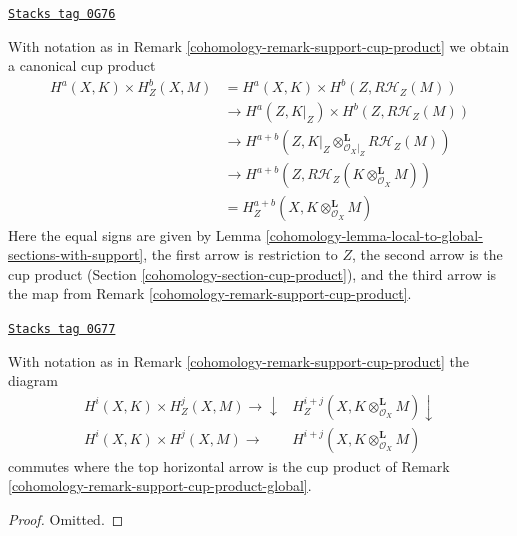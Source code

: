 \begin{remark}
\label{cohomology-remark-support-cup-product-global}
\href{https://stacks.math.columbia.edu/tag/0G76}{\texttt{Stacks tag 0G76}}

With notation as in Remark \ref{cohomology-remark-support-cup-product}
we obtain a canonical cup product
\begin{align*}
H^a(X, K) \times H^b_Z(X, M)
& =
H^a(X, K) \times H^b(Z, R\mathcal{H}_Z(M)) \\
& \to
H^a(Z, K|_Z) \times H^b(Z, R\mathcal{H}_Z(M)) \\
& \to
H^{a + b}(Z, K|_Z \otimes_{\mathcal{O}_X|_Z}^\mathbf{L} R\mathcal{H}_Z(M)) \\
& \to
H^{a + b}(Z, R\mathcal{H}_Z(K \otimes_{\mathcal{O}_X}^\mathbf{L} M)) \\
& =
H^{a + b}_Z(X, K \otimes_{\mathcal{O}_X}^\mathbf{L} M)
\end{align*}
Here the equal signs are given by
Lemma \ref{cohomology-lemma-local-to-global-sections-with-support},
the first arrow is restriction to $Z$, the second
arrow is the cup product (Section \ref{cohomology-section-cup-product}),
and the third arrow is the map from Remark \ref{cohomology-remark-support-cup-product}.
\end{remark}

\begin{lemma}
\label{cohomology-lemma-support-cup-product}
\href{https://stacks.math.columbia.edu/tag/0G77}{\texttt{Stacks tag 0G77}}

With notation as in Remark \ref{cohomology-remark-support-cup-product} the diagram
$$
\begin{array}{cc}H^i(X, K) \times H^j_Z(X, M) \longrightarrow\downarrow & H^{i + j}_Z(X, K \otimes_{\mathcal{O}_X}^\mathbf{L} M) \downarrow \\ H^i(X, K) \times H^j(X, M) \longrightarrow & H^{i + j}(X, K \otimes_{\mathcal{O}_X}^\mathbf{L} M)\end{array}
$$
commutes where the top horizontal arrow is the cup product of
Remark \ref{cohomology-remark-support-cup-product-global}.
\end{lemma}

\begin{proof}
Omitted.
\end{proof}

